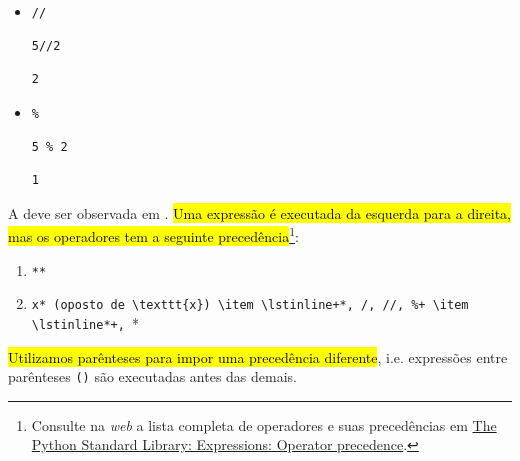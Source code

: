 \begin{itemize}
\item \lstinline+//+ 

\begin{lstlisting}[xrightmargin=2.5em]
5//2
\end{lstlisting}

\begin{verbatim}
2
\end{verbatim}

\item \texttt{\%} 

\begin{lstlisting}[xrightmargin=2.5em]
5 % 2
\end{lstlisting}

\begin{verbatim}
1
\end{verbatim}

\end{itemize}

A  deve ser observada em {\python}. \hl{Uma expressão é executada da esquerda para a direita, mas os operadores tem a seguinte precedência}\footnote{Consulte na \textit{web} a lista completa de operadores e suas precedências em \href{https://docs.python.org/3/reference/expressions.html\#operator-precedence}{The Python Standard Library: Expressions: Operator precedence}.}:

\begin{enumerate}
\item \lstinline+**+
\item \lstinline*-x* (oposto de \texttt{x})
\item \lstinline+*, /, //, %+
\item \lstinline*+, -*
\end{enumerate}

\hl{Utilizamos parênteses para impor uma precedência diferente}, i.e. expressões entre parênteses \lstinline+()+ são executadas antes das demais.

